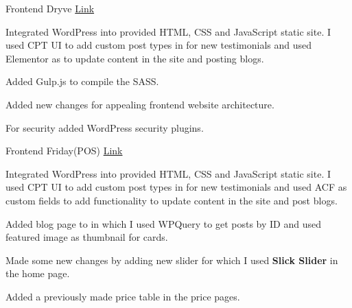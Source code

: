 

\begin{cventries}

  \cventry
    {Frontend} %
    {Dryve} %
    {{\href{https://www.getdryve.com/}{Link}}} %
    {} %
    {
      \begin{cvitems} %
        \item {Integrated WordPress into provided HTML, CSS and JavaScript static site. I used CPT UI to add custom post types in for new testimonials and used Elementor as to update content in the site and posting blogs.}
        \item {Added Gulp.js to compile the SASS.}
        \item {Added new changes for appealing frontend website architecture.}
        \item {For security added WordPress security plugins.}
      \end{cvitems}
    }

  \cventry
    {Frontend} %
    {Friday(POS)} %
    {{\href{https://www.fridaypos.com/}{Link}}} %
    {} %
    {
      \begin{cvitems} %
        \item {Integrated WordPress into provided HTML, CSS and JavaScript static site. I used CPT UI to add custom post types in for new testimonials and used ACF as custom fields to add functionality to update content in the site and post blogs.}
        \item {Added blog page to in which I used WPQuery to get posts by ID and used featured image as thumbnail for cards.}
        \item {Made some new changes by adding new slider for which I used \textbf{Slick Slider} in the home page.}
        \item {Added a previously made price table in the price pages.}
      \end{cvitems}
    }


\end{cventries}
